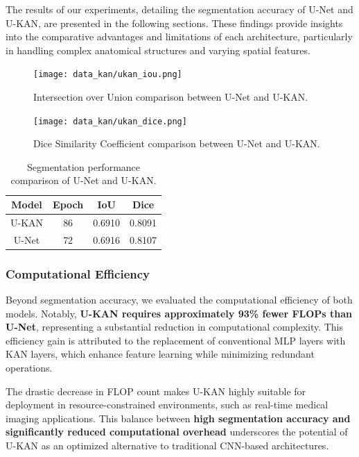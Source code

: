 \documentclass[conference]{IEEEtran}
\begin{document}
The results of our experiments, detailing the segmentation accuracy of U-Net
and U-KAN, are presented in the following sections. These findings provide
insights into the comparative advantages and limitations of each architecture,
particularly in handling complex anatomical structures and varying spatial
features.

\begin{figure}[h!]
    \centering
    \texttt{[image: data\_kan/ukan\_iou.png]}
    \caption{Intersection over Union comparison between U-Net and U-KAN.}
    \label{fig:iou}

    \vspace{10pt} %

    \texttt{[image: data\_kan/ukan\_dice.png]}
    \caption{Dice Similarity Coefficient comparison between U-Net and U-KAN.}
    \label{fig:dice}
\end{figure}

\begin{table}[h!]
    \centering
    \begin{tabular}{|c|c|c|c|}
        \hline
        \textbf{Model} & \textbf{Epoch} & \textbf{IoU} & \textbf{Dice} \\
        \hline
        U-KAN          & 86             & 0.6910       & 0.8091        \\
        U-Net          & 72             & 0.6916       & 0.8107        \\
        \hline
    \end{tabular}
    \caption{Segmentation performance comparison of U-Net and U-KAN.}
    \label{tab:results}
\end{table}

\subsubsection{Computational Efficiency}

Beyond segmentation accuracy, we evaluated the computational efficiency of both
models. Notably, \textbf{U-KAN requires approximately 93\% fewer FLOPs than
    U-Net}, representing a substantial reduction in computational complexity. This
efficiency gain is attributed to the replacement of conventional MLP layers
with KAN layers, which enhance feature learning while minimizing redundant
operations.

The drastic decrease in FLOP count makes U-KAN highly suitable for deployment
in resource-constrained environments, such as real-time medical imaging
applications. This balance between \textbf{high segmentation accuracy and
    significantly reduced computational overhead} underscores the potential of
U-KAN as an optimized alternative to traditional CNN-based architectures.
\end{document}
